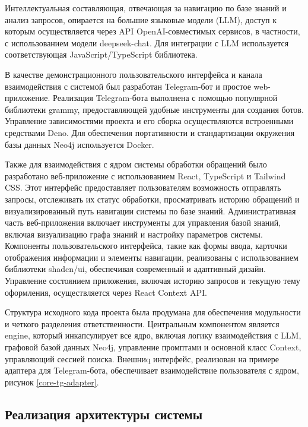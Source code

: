 Интеллектуальная составляющая, отвечающая за навигацию по базе знаний и анализ запросов, опирается на большие языковые модели (LLM), доступ к которым осуществляется через API OpenAI-совместимых сервисов, в частности, с использованием модели deepseek-chat. Для интеграции с LLM используется соответствующая JavaScript/TypeScript библиотека.

В качестве демонстрационного пользовательского интерфейса и канала взаимодействия с системой был разработан Telegram-бот и простое web-приложение. Реализация Telegram-бота выполнена с помощью популярной библиотеки grammy, предоставляющей удобные инструменты для создания ботов. Управление зависимостями проекта и его сборка осуществляются встроенными средствами Deno. Для обеспечения портативности и стандартизации окружения базы данных Neo4j используется Docker.

Также для взаимодействия с ядром системы обработки обращений было разработано веб-приложение с использованием React, TypeScript и Tailwind CSS. Этот интерфейс предоставляет пользователям возможность отправлять запросы, отслеживать их статус обработки, просматривать историю обращений и визуализированный путь навигации системы по базе знаний. Административная часть веб-приложения включает инструменты для управления базой знаний, включая визуализацию графа знаний и настройку параметров системы. Компоненты пользовательского интерфейса, такие как формы ввода, карточки отображения информации и элементы навигации, реализованы с использованием библиотеки shadcn/ui, обеспечивая современный и адаптивный дизайн. Управление состоянием приложения, включая историю запросов и текущую тему оформления, осуществляется через React Context API.


Структура исходного кода проекта была продумана для обеспечения модульности и четкого разделения ответственности. Центральным компонентом является engine, который инкапсулирует все ядро, включая логику взаимодействия с LLM, графовой базой данных Neo4j, управление промптами и основной класс Context, управляющий сессией поиска. Внешниq интерфейс, реализован на примере адаптера для Telegram-бота, обеспечивает взаимодействие пользователя с ядром, рисунок \ref{core-tg-adapter}. 


\subsection{Реализация архитектуры системы}

